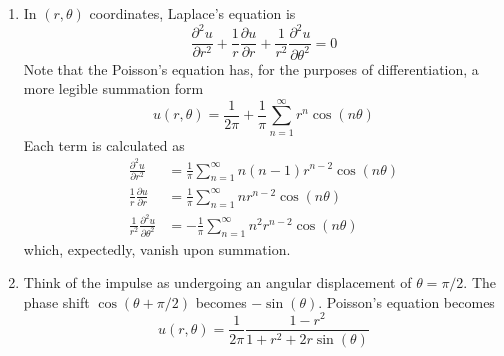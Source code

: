 \documentclass[a4paper]{article}
\begin{document}

\begin{enumerate}[label=(\alph*)]
	\item In \( \!\left( r, \theta \right) \) coordinates, Laplace's equation is
	\[
		\frac{\partial^{2} u}{\partial r^{2}} + \frac{1}{r} \frac{\partial u}{\partial r} + \frac{1}{r^{2}} \frac{\partial^{2} u}{\partial \theta^{2}} = 0
	\]
	Note that the Poisson's equation has, for the purposes of differentiation, a more legible summation form
	\[
		u \!\left( r, \theta \right) = \frac{1}{2 \pi} + \frac{1}{\pi} \sum_{n = 1}^{\infty} r^{n}\cos\!\left(n \theta\right) 
	\]
	Each term is calculated as 
	\begin{align*}
		\frac{\partial^{2} u}{\partial r^{2}} & = \frac{1}{\pi} \sum_{n = 1}^{\infty} n \!\left( n - 1 \right) r^{n - 2} \cos\!\left(n \theta\right) \\
		\frac{1}{r} \frac{\partial u}{\partial r} & = \frac{1}{\pi} \sum_{n = 1}^{\infty} nr^{n - 2} \cos\!\left(n \theta\right) \\
		\frac{1}{r^{2}} \frac{\partial^{2} u}{\partial \theta^{2}} & = -\frac{1}{\pi} \sum_{n = 1}^{\infty} n^{2}r^{n - 2} \cos\!\left(n \theta\right) 
	\end{align*}
	which, expectedly, vanish upon summation.
	\item Think of the impulse as undergoing an angular displacement of \( \theta = \pi / 2 \). The phase shift \( \cos\!\left(\theta + \pi / 2 \right) \) becomes \( -\sin\!\left(\theta\right) \). Poisson's equation becomes
	\[
		u \!\left( r, \theta \right) = \frac{1}{2 \pi} \frac{1 - r^{2}}{1 + r^{2} + 2r \sin\!\left(\theta\right) } 
	\]
\end{enumerate}

\end{document}
